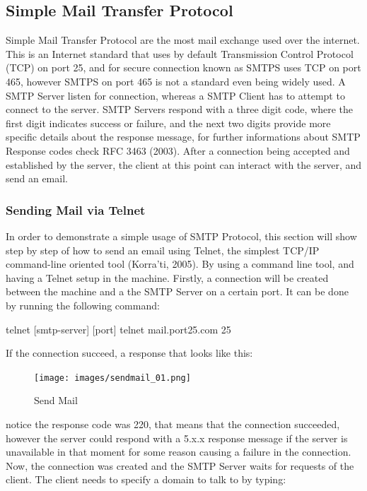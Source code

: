 \documentclass[a4paper, 12pt]{article}
\begin{document}
\subsection{Simple Mail Transfer Protocol}

Simple Mail Transfer Protocol are the most mail exchange used over the internet. This is an Internet standard that uses by default Transmission Control Protocol (TCP) on port 25, and for secure connection known as SMTPS uses TCP on port 465, however SMTPS on port 465 is not a standard even being widely used. A SMTP Server listen for connection, whereas a SMTP Client has to attempt to connect to the server. SMTP Servers respond with a three digit code, where the first digit indicates success or failure, and the next two digits provide more specific details about the response message, for further informations about SMTP Response codes check RFC 3463 (2003). After a connection being accepted and established by the server, the client at this point can interact with the server, and send an email.

\subsubsection{Sending Mail via Telnet}

In order to demonstrate a simple usage of SMTP Protocol, this section will show step by step of how to send an email using Telnet, the simplest TCP/IP command-line oriented tool (Korra'ti, 2005). By using a command line tool, and having a Telnet setup in the machine. Firstly, a connection will be created between the machine and a the SMTP Server on a certain port. It can be done by running the following command:

telnet [smtp-server] [port]
telnet mail.port25.com 25

If the connection succeed, a response that looks like this:

\noindent
\begin{figure}
	\centering
	\texttt{[image: images/sendmail\_01.png]}
	\caption{Send Mail}
	\label{img:sendmail_01}
\end{figure}

\noindent
notice the response code was 220, that means that the connection succeeded, however the server could respond with a 5.x.x response message if the server is unavailable in that moment for some reason causing a failure in the connection. Now, the connection was created and the SMTP Server waits for requests of the client. The client needs to specify a domain to talk to by typing:
\end{document}
